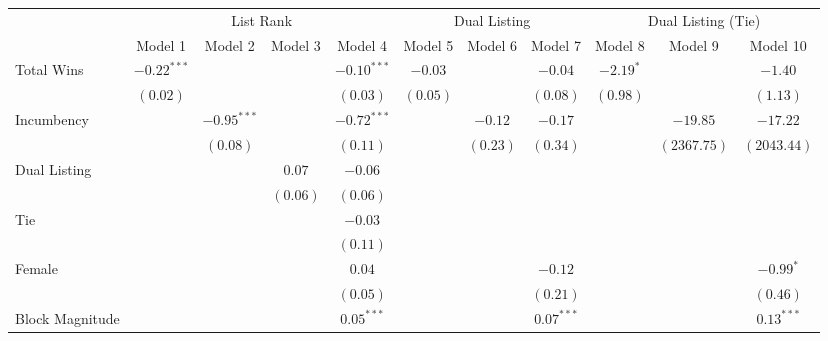 
\begin{table}
\begin{center}
\begin{tabular}{l c c c c c c c c c c}
\hline
 & \multicolumn{4}{c}{List Rank} & \multicolumn{3}{c}{Dual Listing} & \multicolumn{3}{c}{Dual Listing (Tie)} \\
\cline{2-5} \cline{6-8} \cline{9-11}
 & Model 1 & Model 2 & Model 3 & Model 4 & Model 5 & Model 6 & Model 7 & Model 8 & Model 9 & Model 10 \\
\hline
Total Wins       & $-0.22^{***}$ &               &           & $-0.10^{***}$ & $-0.03$   &           & $-0.04$      & $-2.19^{*}$ &             & $-1.40$      \\
                 & $(0.02)$      &               &           & $(0.03)$      & $(0.05)$  &           & $(0.08)$     & $(0.98)$    &             & $(1.13)$     \\
Incumbency       &               & $-0.95^{***}$ &           & $-0.72^{***}$ &           & $-0.12$   & $-0.17$      &             & $-19.85$    & $-17.22$     \\
                 &               & $(0.08)$      &           & $(0.11)$      &           & $(0.23)$  & $(0.34)$     &             & $(2367.75)$ & $(2043.44)$  \\
Dual Listing     &               &               & $0.07$    & $-0.06$       &           &           &              &             &             &              \\
                 &               &               & $(0.06)$  & $(0.06)$      &           &           &              &             &             &              \\
Tie              &               &               &           & $-0.03$       &           &           &              &             &             &              \\
                 &               &               &           & $(0.11)$      &           &           &              &             &             &              \\
Female           &               &               &           & $0.04$        &           &           & $-0.12$      &             &             & $-0.99^{*}$  \\
                 &               &               &           & $(0.05)$      &           &           & $(0.21)$     &             &             & $(0.46)$     \\
Block Magnitude  &               &               &           & $0.05^{***}$  &           &           & $0.07^{***}$ &             &             & $0.13^{***}$ \\

\end{tabular}
\end{center}
\end{table}
